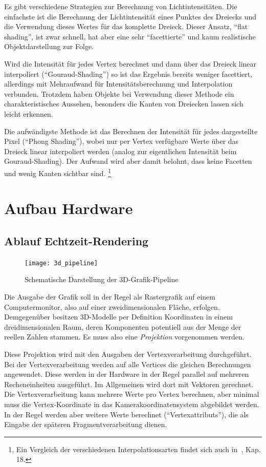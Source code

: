 \documentclass[twoside,a4paper,fleqn,12pt]{book}
\begin{document}
Es gibt verschiedene Strategien zur Berechnung von Lichtintensitäten. Die einfachste ist die Berechnung der Lichtintensität
eines Punktes des Dreiecks und die Verwendung dieses Wertes für das komplette Dreieck. Dieser Ansatz, ``flat shading'',
ist zwar schnell, hat aber eine sehr "`facettierte"' und kaum realistische Objektdarstellung zur Folge.

Wird die Intensität für jedes Vertex berechnet und dann über das Dreieck linear interpoliert ("`Gouraud-Shading"') so ist
das Ergebnis bereits weniger facettiert, allerdings mit Mehraufwand für Intensitätsberechnung und Interpolation verbunden.
Trotzdem haben Objekte bei Verwendung dieser Methode ein charakteristisches Aussehen, besonders die Kanten von Dreiecken lassen sich leicht erkennen.

Die aufwändigste Methode ist das Berechnen der Intensität für jedes dargestellte Pixel ("`Phong Shading"'), wobei
nur per Vertex verfügbare Werte über das Dreieck linear interpoliert werden (analog zur eigentlichen Intensität beim
Gouraud-Shading). Der Aufwand wird aber damit belohnt, dass keine Facetten und wenig Kanten sichtbar sind.
\footnote{Ein Vergleich der verschiedenen Interpolationsarten findet sich auch in~\cite{watt_de}, Kap. 18.}

\section{Aufbau Hardware}

\subsection{Ablauf Echtzeit-Rendering}

\begin{figure}[h]
  \centering
  \texttt{[image: 3d\_pipeline]}
  \caption{Schematische Darstellung der 3D-Grafik-Pipeline}
  \label{fig:3d_pipeline}
\end{figure}

Die Ausgabe der Grafik soll in der Regel als Rastergrafik auf einem Computermonitor, also auf einer zweidimensionalen Fläche, erfolgen.
Demgegenüber besitzen 3D-Modelle per Definition Koordinaten in einem dreidimensionalen Raum, deren Komponenten potentiell
aus der Menge der reellen Zahlen stammen. Es muss also eine \emph{Projektion} vorgenommen werden. 

Diese Projektion wird mit den Ausgaben der Vertexverarbeitung durchgeführt. Bei der Vertexverarbeitung werden auf alle Vertices die gleichen
Berechnungen angewendet. Diese werden in der Hardware in der Regel parallel 
auf mehreren Recheneinheiten ausgeführt. Im Allgemeinen wird dort mit Vektoren gerechnet.
Die Vertexverarbeitung kann mehrere Werte pro Vertex berechnen, aber minimal muss die Vertex-Koordinate in das Kamerakoordinatensystem
abgebildet werden.
In der Regel werden aber weitere Werte berechnet ("`\glspl{Vertexattribut}"'), die als Eingabe der späteren Fragmentverarbeitung dienen.
\end{document}
